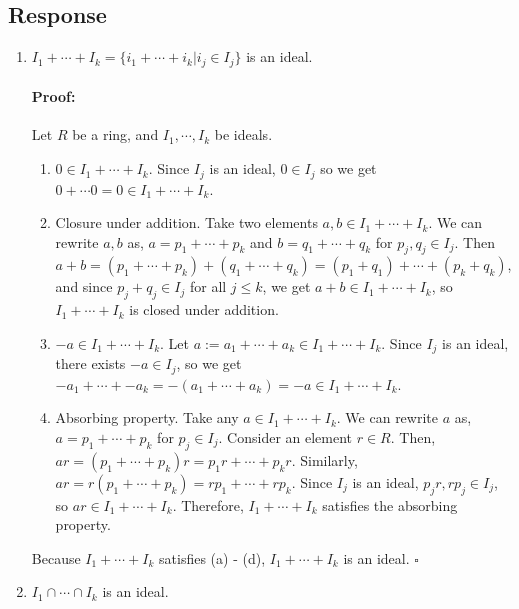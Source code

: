 \documentclass [12pt] {article}
\newenvironment{proof}{\paragraph{Proof:}}{\hfill$\square$}
\begin{document}
\subsection*{Response}
\begin{enumerate}
    \item $I_1+\cdots+I_k=\{i_1+\cdots+i_k|i_j\in I_j\}$ is an ideal.
        \vspace{-1.5em}
        \begin{proof}
            Let $R$ be a ring, and $I_1, \cdots, I_k$ be ideals.
            \begin{enumerate}
                \item $0 \in I_1 + \cdots + I_k$. Since $I_j$ is an ideal, $0 \in I_j$ so we get
                    $0 + \cdots 0 = 0 \in I_1 + \cdots + I_k$.
                \item Closure under addition. Take two elements $a, b \in I_1 + \cdots + I_k$. We can
                    rewrite $a, b$ as,
                    $a = p_1 + \cdots + p_k$ and $b = q_1 + \cdots + q_k$ for $p_j, q_j \in I_j$. Then
                    $
                    a + b 
                    = (p_1 + \cdots + p_k) + (q_1 + \cdots + q_k)
                    = (p_1 + q_1) + \cdots + (p_k + q_k)
                    $, and since $p_j + q_j \in I_j$ for all $j \leq k$, we get 
                    $a + b \in I_1 + \cdots + I_k$, so $I_1 + \cdots + I_k$ is closed under addition.
                \item $-a \in I_1 + \cdots + I_k$. Let $a := a_1 + \cdots + a_k \in I_1 + \cdots + I_k$.
                    Since $I_j$ is an ideal, there exists $-a \in I_j$, so we get 
                    $-a_1 + \cdots + -a_k  = -(a_1 + \cdots + a_k)  = -a \in I_1 + \cdots + I_k$.
                \item Absorbing property. Take any $a \in I_1 + \cdots + I_k$. We can
                    rewrite $a$ as, $a = p_1 + \cdots + p_k$ for $p_j \in I_j$. Consider an element $r \in R$. 
                    Then, $ar = (p_1 + \cdots + p_k) r = p_1 r + \cdots + p_k r$. Similarly,
                    $ar = r (p_1 + \cdots + p_k) = r p_1 + \cdots + r p_k$. Since $I_j$ is an ideal, 
                    $p_j r, r p_j \in I_j$, so $ar \in I_1 + \cdots + I_k$. Therefore, $I_1 + \cdots + I_k$ 
                    satisfies the absorbing property.
            \end{enumerate}
            Because $I_1 + \cdots + I_k$ satisfies (a) - (d), $I_1 + \cdots + I_k$ is an ideal.
        \end{proof}
    \item $I_1 \cap \cdots \cap I_k$ is an ideal.

\end{enumerate}
\end{document}
